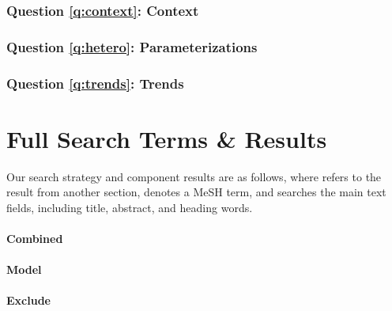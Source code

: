 \documentclass{article}
\begin{document}
\subsubsection{Question \ref{q:context}: Context}
\subsubsection{Question \ref{q:hetero}: Parameterizations}
\subsubsection{Question \ref{q:trends}: Trends}
\clearpage
\printbibliography
\clearpage
\appendix
\section{Full Search Terms \& Results}\label{app:search}
Our search strategy and component results are as follows, where
\searchtext{[section]} refers to the result from another section,
 denotes a MeSH term, and
 searches the main text fields, including
title, abstract, and heading words.
\small
\paragraph{Combined} \n\nobreak{}
\paragraph{Model}    \n\nobreak{}
\paragraph{\hiv}     \n\nobreak{}
\paragraph{Exclude}  \n\nobreak{}
\paragraph{\ssa}     \n\nobreak{}

%
%
\end{document}
